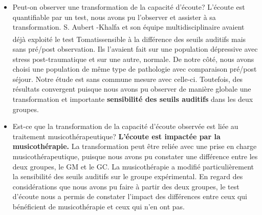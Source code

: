   \begin{itemize}
       \item Peut-on observer une transformation de la capacité d'écoute?
          L'écoute est quantifiable  par un test, nous avons pu l'observer et  assister à sa
  transformation. 
  S. Aubert -Khalfa et son équipe multidisciplinaire \autocite{affectiveDisorders} avaient déjà
  exploité le test Tomatis\textsuperscript \textregistered    sensible à la différence des
  seuils auditifs mais sans pré/post observation. Ils l'avaient fait sur une population
  dépressive avec stress post-traumatique et sur une autre, normale. De notre côté, nous avons choisi
  une population de même type de pathologie avec comparaison pré/post séjour.
  Notre étude est sans commune mesure avec celle-ci. Toutefois, 
  des résultats convergent puisque nous avons pu observer de manière globale une transformation et 
  importante 
 \textbf{ sensibilité des seuils auditifs} dans les deux groupes. 
 
 	\item Est-ce que la transformation de la capacité d'écoute observée est liée
 au traitement musicothérapeutique? 
  \textbf{L'écoute est impactée par la musicothérapie.} La transformation peut être reliée  avec
 une prise en charge musicothérapeutique, puisque nous avons pu constater une différence entre les 
 deux groupes, le GM et le GC. 
 La musicothérapie a  modifié particulièrement  la  sensibilité des seuils auditifs sur le groupe 
 expérimental.
 En regard des considérations que nous avons pu faire à partir des deux groupes,
 le test d'écoute nous a permis de constater l'impact des différences  entre ceux qui bénéficient de 
 musicothérapie et ceux qui n'en ont pas.
 

\end{itemize}
